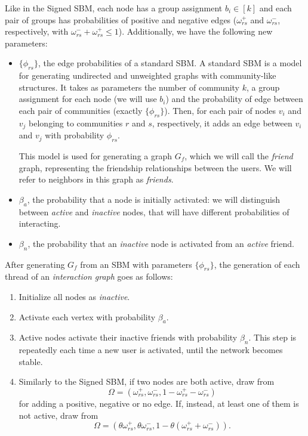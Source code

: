 Like in the Signed SBM, each node has a group assignment $b_i \in [k]$ and
each pair of groups has probabilities of
positive and negative edges ($\omega _{rs}^{+}  $ and $\omega _{rs}^{-}  $,
respectively, with $\omega ^{-} _{rs} + \omega ^{+} _{rs}
	\leq 1$).
Additionally, we have the following new parameters:

\begin{itemize}
	\item $\{\phi_{rs} \}$, the edge probabilities of a standard SBM.
	      A standard SBM is a model for generating undirected and unweighted
	      graphs with community-like structures. It takes as parameters the number
	      of community $k$, a group assignment for each node (we will use $b_i$)
	      and the probability of edge between each pair of communities (exactly
	      $\{\phi_{rs} \}$). Then, for each pair of nodes $v_i$ and $v_j$
	      belonging to communities $r$ and $s$, respectively, it adds an edge
	      between $v_i$ and $v_j$ with probability $\phi_{rs}$.

	      This model is used for generating a graph $G_f$, which we will call the \emph{friend} graph,
	      representing the friendship relationships between the users. We will
	      refer to neighbors in this graph as \emph{friends}.
	\item $\beta _a$, the probability that a node is initially activated: we
	      will distinguish between \emph{active} and \emph{inactive} nodes, that will have
	      different probabilities of interacting.
	\item $\beta _n$, the probability that an \emph{inactive} node is activated
	      from an \emph{active} friend.
\end{itemize}

\bigskip
After generating $G_f$ from an SBM with parameters $\{\phi_{rs} \}$, the
generation of each thread of an \emph{interaction graph} goes as
follows:

\begin{enumerate}
	\item Initialize all nodes as \emph{inactive}.
	\item Activate each vertex with probability $\beta_{a}  $.
	\item Active nodes activate their inactive friends with
	      probability $\beta_n$. This step is repeatedly each time a new user
	      is activated, until the network becomes stable.
	\item Similarly to the Signed SBM, if two nodes are both active, draw
	      from
	      \begin{equation*}
		      \Omega = (\omega _{rs} ^{+}, \omega _{rs} ^{-}, 1 - \omega _{rs} ^{+} -
		      \omega _{rs} ^{-})
	      \end{equation*}
	      for adding a positive, negative or no edge. If, instead, at least one
	      of them is not active, draw from
	      \begin{equation*}
		      \Omega = (\theta \omega _{rs} ^{+}, \theta \omega _{rs} ^{-}, 1
		      - \theta (\omega _{rs} ^{+} + \omega _{rs} ^{-})).
	      \end{equation*}
\end{enumerate}

